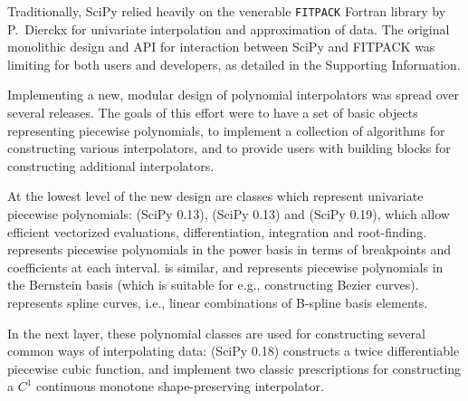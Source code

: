 Traditionally, SciPy relied heavily on the venerable \texttt{FITPACK}
Fortran library by P.~Dierckx \cite{Dierckx:1993:CSF:151103, FITPACK} for
univariate interpolation and approximation of data. The original monolithic
design and API for interaction between SciPy and FITPACK was limiting for both
users and developers, as detailed in the Supporting Information.

Implementing a new, modular design of polynomial interpolators was spread over
several releases. The goals of this effort were to have a set of basic objects
representing piecewise polynomials, to implement a collection of algorithms
for constructing various interpolators, and to provide users with building
blocks for constructing additional interpolators.

At the lowest level of the new design are classes which represent univariate
piecewise polynomials:  (SciPy 0.13)\cite{scipy-gh2885},
 (SciPy 0.13) and  (SciPy 0.19)\cite{scipy-gh3174},
which allow
efficient vectorized evaluations, differentiation, integration and root-finding.
 represents piecewise polynomials in the power basis in terms of
breakpoints and coefficients at each interval.  is similar, and
represents piecewise polynomials in the Bernstein basis (which is suitable
for e.g., constructing Bezier curves).  represents spline
curves, i.e., linear combinations of B-spline basis elements.\cite{deBoor1978} 

In the next layer, these polynomial classes are used for constructing several
common ways of interpolating data:  (SciPy 0.18)
\cite{scipy-gh5653} constructs a twice 
differentiable piecewise cubic function,  
and  implement two classic prescriptions for
constructing a $C^1$ continuous monotone shape-preserving interpolator.
\cite{FritschCarlson1980, Akima1970}
